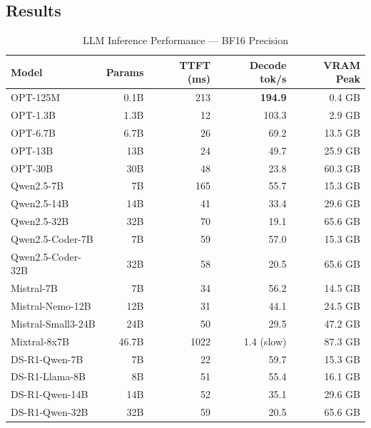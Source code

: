 \documentclass[11pt,a4paper]{article}
\begin{document}
\subsection{Results}

\begin{table}[h!]
\centering
\caption{LLM Inference Performance --- BF16 Precision}
\label{tab:inf-bf16}
\begin{tabular}{lrrrr}
\toprule
\textbf{Model} & \textbf{Params} & \textbf{TTFT (ms)} & \textbf{Decode tok/s} & \textbf{VRAM Peak} \\
\midrule
OPT-125M           & 0.1B  & 213  & \textbf{194.9} & 0.4 GB \\
OPT-1.3B           & 1.3B  & 12   & 103.3          & 2.9 GB \\
OPT-6.7B           & 6.7B  & 26   & 69.2           & 13.5 GB \\
OPT-13B            & 13B   & 24   & 49.7           & 25.9 GB \\
OPT-30B            & 30B   & 48   & 23.8           & 60.3 GB \\
\midrule
Qwen2.5-7B         & 7B    & 165  & 55.7           & 15.3 GB \\
Qwen2.5-14B        & 14B   & 41   & 33.4           & 29.6 GB \\
Qwen2.5-32B        & 32B   & 70   & 19.1           & 65.6 GB \\
Qwen2.5-Coder-7B   & 7B    & 59   & 57.0           & 15.3 GB \\
Qwen2.5-Coder-32B  & 32B   & 58   & 20.5           & 65.6 GB \\
\midrule
Mistral-7B         & 7B    & 34   & 56.2           & 14.5 GB \\
Mistral-Nemo-12B   & 12B   & 31   & 44.1           & 24.5 GB \\
Mistral-Small3-24B & 24B   & 50   & 29.5           & 47.2 GB \\
Mixtral-8x7B       & 46.7B & 1022 & 1.4 (slow)     & 87.3 GB \\
\midrule
DS-R1-Qwen-7B      & 7B    & 22   & 59.7           & 15.3 GB \\
DS-R1-Llama-8B     & 8B    & 51   & 55.4           & 16.1 GB \\
DS-R1-Qwen-14B     & 14B   & 52   & 35.1           & 29.6 GB \\
DS-R1-Qwen-32B     & 32B   & 59   & 20.5           & 65.6 GB \\
\bottomrule
\end{tabular}
\end{table}
\end{document}
